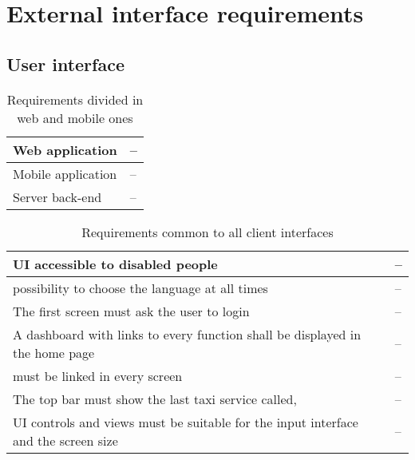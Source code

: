 \section{External interface requirements}
\subsection{User interface}

\begin{table}
\begin{center}
\begin{tabular}{|l|l|}
\hline
Web application  & --\\
\hline
Mobile application  & --\\
\hline
Server back-end  & --\\
\hline
\end{tabular}
\caption{Requirements divided in web and mobile ones}
\end{center}
\end{table}


\begin{table}
\begin{center}
\begin{tabular}{|l|l|}
\hline
UI accessible to disabled people & --\\
\hline
possibility to choose the language at all times  & --\\
\hline
The first screen must ask the user to login  & --\\
\hline
A dashboard with links to every function shall be displayed in the home page & --\\
\hline
must be linked in every screen & --\\
\hline
The top bar must show the last taxi service called, & --\\
\hline
UI controls and views must be suitable for the input interface and the screen size & --\\
\hline
\end{tabular}
\caption{Requirements common to all client interfaces }
\end{center}
\end{table}









